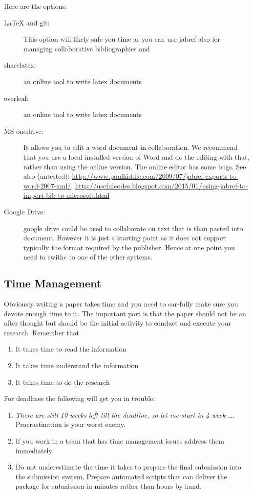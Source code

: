 Here are the options:

\begin{description}

\item [LaTeX and git:] This option will likely safe you time as you can use
  jabref also for managing collaborative bibliographies and
\item [sharelatex:] an online tool to write latex documents
\item [overleaf:] an online tool to write latex documents
\item [MS onedrive:] It allows you to edit a word document in collaboration.
  We recommend that you use a local installed version of Word and do the
  editing with that, rather than using the online version. The online
  editor has some bugs. See also (untested):
  \url{http://www.paulkiddie.com/2009/07/jabref-exports-to-word-2007-xml/},
  \url{http://usefulcodes.blogspot.com/2015/01/using-jabref-to-import-bib-to-microsoft.html}
\item [Google Drive:] google drive could be used to collaborate on text that
  is than pasted into document. However it is just a starting point as
  it does not support typically the format required by the publisher.
  Hence at one point you need to swithc to one of the other systems.
\end{description}

\subsection{Time Management}\label{timemanagement}

Obviously writing a paper takes time and you need to car-fully make sure
you devote enough time to it. The important part is that the paper
should not be an after thought but should be the initial activity to
conduct and execute your research. Remember that

\begin{enumerate}

\item  It takes time to read the information
\item  It takes time understand the information
\item  It takes time to do the research

\end{enumerate}

For deadlines the following will get you in trouble:

\begin{enumerate}

\item
  \emph{There are still 10 weeks left till the deadline, so let me start
  in 4 week \ldots{}}. Procrastination is your worst enemy.
\item
  If you work in a team that has time management issues address them
  immediately
\item
  Do not underestimate the time it takes to prepare the final submission
  into the submission system. Prepare automated scripts that can deliver
  the package for submission in minutes rather than hours by hand.
\end{enumerate}

